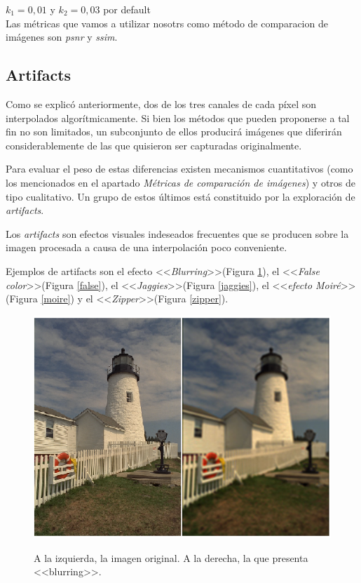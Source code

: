 \documentclass[a4paper]{article}
\begin{document}
$k_1 = 0,01$ y $k_2 = 0,03$ por default\\

Las m\'etricas que vamos a utilizar nosotrs como m\'etodo de comparacion de im\'agenes son \emph{psnr} y \emph{ssim}.

\newpage
\subsection{Artifacts}

Como se explicó anteriormente, dos de los tres canales de cada p\'ixel son interpolados algorítmicamente. Si bien los métodos que pueden proponerse a tal fin no son limitados, un subconjunto de ellos producirá imágenes que diferirán considerablemente de las que quisieron ser capturadas originalmente. 

Para evaluar el peso de estas diferencias  existen mecanismos cuantitativos (como los mencionados en el apartado \emph{M\'etricas de comparaci\'on de im\'agenes}) y otros de tipo cualitativo. Un grupo de estos últimos está constituido por la exploración de \textit{artifacts}.

Los \textit{artifacts} son efectos visuales indeseados frecuentes que se producen sobre la imagen procesada a causa de una interpolación poco conveniente. 

Ejemplos de artifacts son el efecto <<\emph{Blurring}>>(Figura \ref{blurring}), el <<\emph{False color}>>(Figura \ref{false}), el <<\emph{Jaggies}>>(Figura \ref{jaggies}),   el <<\emph{efecto Moiré}>>(Figura \ref{moire}) y el <<\emph{Zipper}>>(Figura \ref{zipper}).


\begin{figure}[h!]
	\caption{A la izquierda, la imagen original. A la derecha, la que presenta <<blurring>>.}
	\begin{center}
	\includegraphics[scale=0.66]{imagenes/blurring}
	\label{blurring}
  \end{center}
\end{figure}
\end{document}
